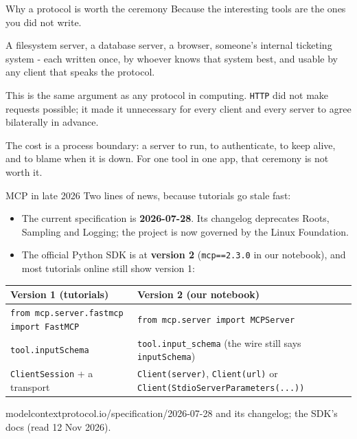 \documentclass[aspectratio=169]{beamer}
\newcommand{\takebox}[1]{%
  \begin{tcolorbox}[colback=paramgreen!8, colframe=paramgreen, boxrule=0.6pt, arc=2pt]
  #1
  \end{tcolorbox}}
\newcommand{\watchbox}[1]{%
  \begin{tcolorbox}[colback=armorange!12, colframe=armorange, boxrule=0.6pt, arc=2pt]
  #1
  \end{tcolorbox}}
\newcommand{\src}[1]{{\scriptsize\color{gray} #1}}
\begin{document}
\begin{frame}{Why a protocol is worth the ceremony}
  \vspace{0.35em}
  Because the interesting tools are the ones you did not write.

  \vspace{0.4em}
  A filesystem server, a database server, a browser, someone's internal ticketing system - each written once,
  by whoever knows that system best, and usable by any client that speaks the protocol.

  \vspace{0.45em}
  \takebox{This is the same argument as any protocol in computing. \texttt{HTTP} did not make requests possible;
  it made it unnecessary for every client and every server to agree bilaterally in advance.}

  \vspace{0.3em}
  \watchbox{The cost is a process boundary: a server to run, to authenticate, to keep alive, and to blame when
  it is down. For one tool in one app, that ceremony is not worth it.}
\end{frame}

\begin{frame}{MCP in late 2026}
  \vspace{0.2em}
  {\small Two lines of news, because tutorials go stale fast:}
  \begin{itemize}
    \item {\small The current specification is \textbf{2026-07-28}. Its changelog deprecates Roots, Sampling and
      Logging; the project is now governed by the Linux Foundation.}
    \item {\small The official Python SDK is at \textbf{version 2} (\texttt{mcp==2.3.0} in our notebook), and
      most tutorials online still show version 1:}
  \end{itemize}

  \vspace{0.1em}
  \begin{center}
  \footnotesize
  \begin{tabular}{>{\raggedright\arraybackslash}p{}>{\raggedright\arraybackslash}p{}}
    \toprule
    \textbf{Version 1 (tutorials)} & \textbf{Version 2 (our notebook)} \\
    \midrule
    \texttt{from mcp.server.fastmcp import FastMCP} & \texttt{from mcp.server import MCPServer} \\
    \texttt{tool.inputSchema} & \texttt{tool.input\_schema} (the wire still says \texttt{inputSchema}) \\
    \texttt{ClientSession} + a transport & \texttt{Client(server)}, \texttt{Client(url)} or
      \texttt{Client(StdioServerParameters(...))} \\
    \bottomrule
  \end{tabular}
  \end{center}

  \vspace{0.2em}
  \src{modelcontextprotocol.io/specification/2026-07-28 and its changelog; the SDK's docs (read 12 Nov 2026).}
\end{frame}
\end{document}
